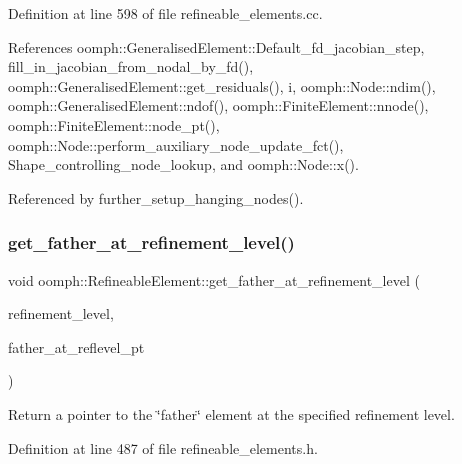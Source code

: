 Definition at line 598 of file refineable\+\_\+elements.\+cc.



References oomph\+::\+Generalised\+Element\+::\+Default\+\_\+fd\+\_\+jacobian\+\_\+step, fill\+\_\+in\+\_\+jacobian\+\_\+from\+\_\+nodal\+\_\+by\+\_\+fd(), oomph\+::\+Generalised\+Element\+::get\+\_\+residuals(), i, oomph\+::\+Node\+::ndim(), oomph\+::\+Generalised\+Element\+::ndof(), oomph\+::\+Finite\+Element\+::nnode(), oomph\+::\+Finite\+Element\+::node\+\_\+pt(), oomph\+::\+Node\+::perform\+\_\+auxiliary\+\_\+node\+\_\+update\+\_\+fct(), Shape\+\_\+controlling\+\_\+node\+\_\+lookup, and oomph\+::\+Node\+::x().



Referenced by further\+\_\+setup\+\_\+hanging\+\_\+nodes().

\mbox{\label{classoomph_1_1RefineableElement_a6ade15684ccece690c3ba8aebcc02797}} 
\subsubsection{\texorpdfstring{get\+\_\+father\+\_\+at\+\_\+refinement\+\_\+level()}{get\_father\_at\_refinement\_level()}}
{\footnotesize\ttfamily void oomph\+::\+Refineable\+Element\+::get\+\_\+father\+\_\+at\+\_\+refinement\+\_\+level (\begin{DoxyParamCaption}\item[{unsigned \&}]{refinement\+\_\+level,  }\item[{\hyperlink{classoomph_1_1RefineableElement}{Refineable\+Element} $\ast$\&}]{father\+\_\+at\+\_\+reflevel\+\_\+pt }\end{DoxyParamCaption})\hspace{0.3cm}{\ttfamily [inline]}}



Return a pointer to the \char`\"{}father\char`\"{} element at the specified refinement level. 



Definition at line 487 of file refineable\+\_\+elements.\+h.



